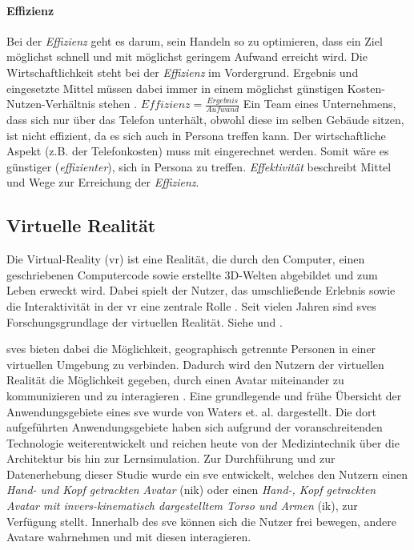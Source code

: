 \documentclass[a4paper,11pt]{article}%
\renewcommand{\\}{\vspace*{0.5\baselineskip} \newline}
\begin{document}
\paragraph{Effizienz}
Bei der \textit{Effizienz} geht es darum, sein Handeln so zu optimieren, dass ein Ziel möglichst schnell und mit möglichst geringem Aufwand erreicht wird. Die Wirtschaftlichkeit steht bei der \textit{Effizienz} im Vordergrund. Ergebnis und eingesetzte Mittel müssen dabei immer in einem möglichst günstigen Kosten-Nutzen-Verhältnis stehen \citep{eichhorn2005prinzip}.\\
$Effizienz = \frac{Ergebnis}{Aufwand}$\\
Ein Team eines Unternehmens, dass sich nur über das Telefon unterhält, obwohl diese im selben Gebäude sitzen, ist nicht effizient, da es sich auch in Persona treffen kann.
Der wirtschaftliche Aspekt (z.B. der Telefonkosten) muss mit eingerechnet werden. Somit wäre es günstiger (\textit{effizienter}), sich in Persona zu treffen.
\newline\newline
\textit{Effektivität} beschreibt Mittel und Wege zur Erreichung der \textit{Effizienz}.
\newpage
	\subsection{Virtuelle Realität}
	\label{Virtual Reality}
Die Virtual-Reality (\ac{vr}) ist eine Realität, die durch den Computer, einen geschriebenen Computercode sowie erstellte 3D-Welten abgebildet und zum Leben erweckt wird. Dabei spielt der Nutzer, das umschließende Erlebnis sowie die Interaktivität in der \ac{vr} eine zentrale Rolle \citep[S. 6-12]{sherman2018understanding}.
Seit vielen Jahren sind \ac{sve}s Forschungsgrundlage der virtuellen Realität. Siehe \citep{shuffler2011there} \citep{steed1999leadership} und \citep{de2011level}.

	\ac{sve}s bieten dabei die Möglichkeit, geographisch getrennte Personen in einer virtuellen Umgebung zu verbinden. Dadurch wird den Nutzern der virtuellen Realität die Möglichkeit gegeben, durch einen Avatar miteinander zu kommunizieren und zu interagieren \citep[S. 1-3]{pettifer1999designing}. Eine grundlegende und frühe Übersicht der Anwendungsgebiete eines \ac{sve} wurde von Waters et. al. \citep{waters1997rise} dargestellt. Die dort aufgeführten Anwendungsgebiete haben sich aufgrund der voranschreitenden Technologie weiterentwickelt und reichen heute von der Medizintechnik über die Architektur bis hin zur Lernsimulation.
Zur Durchführung und zur Datenerhebung dieser Studie wurde ein \ac{sve} entwickelt, welches den Nutzern einen \textit{Hand- und Kopf getrackten Avatar} (\ac{nik}) oder einen \textit{Hand-, Kopf getrackten Avatar mit invers-kinematisch dargestelltem Torso und Armen} (\ac{ik}), zur Verfügung stellt. Innerhalb des \ac{sve} können sich die Nutzer frei bewegen, andere Avatare wahrnehmen und mit diesen interagieren.
	
\end{document}
